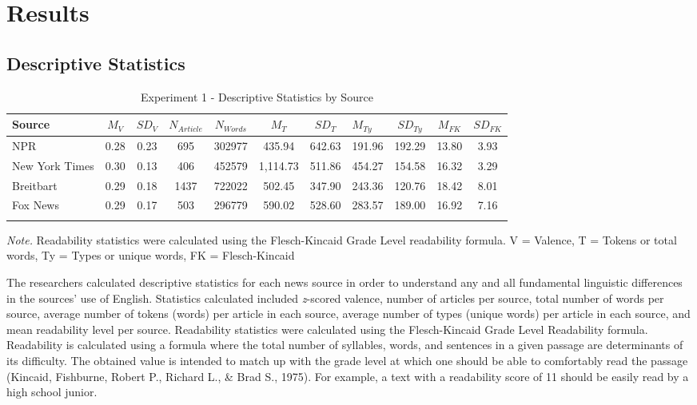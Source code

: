 \documentclass[english,,man]{apa6}
\begin{document}
\hypertarget{results}{%
\section{Results}\label{results}}

\hypertarget{descriptive-statistics}{%
\subsection{Descriptive Statistics}\label{descriptive-statistics}}

\begin{table}[tbp]
\begin{center}
\begin{threeparttable}
\caption{\label{tab:exp1-source-descriptives}Experiment 1 - Descriptive Statistics by Source}
\begin{tabular}{lcccccclccc}
\toprule
Source & $M_V$ & $SD_V$ & $N_{Article}$ & $N_{Words}$ & $M_T$ & $SD_T$ & $M_{Ty}$ & $SD_{Ty}$ & $M_{FK}$ & $SD_{FK}$\\
\midrule
NPR & 0.28 & 0.23 & 695 & 302977 & 435.94 & 642.63 & 191.96 & 192.29 & 13.80 & 3.93\\
New York Times & 0.30 & 0.13 & 406 & 452579 & 1,114.73 & 511.86 & 454.27 & 154.58 & 16.32 & 3.29\\
Breitbart & 0.29 & 0.18 & 1437 & 722022 & 502.45 & 347.90 & 243.36 & 120.76 & 18.42 & 8.01\\
Fox News & 0.29 & 0.17 & 503 & 296779 & 590.02 & 528.60 & 283.57 & 189.00 & 16.92 & 7.16\\
\bottomrule
\addlinespace
\end{tabular}
\begin{tablenotes}[para]
\normalsize{\textit{Note.} Readability statistics were calculated using the Flesch-Kincaid Grade Level readability formula. V = Valence, T = Tokens or total words, Ty = Types or unique words, FK = Flesch-Kincaid}
\end{tablenotes}
\end{threeparttable}
\end{center}
\end{table}

The researchers calculated descriptive statistics for each news source in order to understand any and all fundamental linguistic differences in the sources' use of English. Statistics calculated included \emph{z}-scored valence, number of articles per source, total number of words per source, average number of tokens (words) per article in each source, average number of types (unique words) per article in each source, and mean readability level per source. Readability statistics were calculated using the Flesch-Kincaid Grade Level Readability formula. Readability is calculated using a formula where the total number of syllables, words, and sentences in a given passage are determinants of its difficulty. The obtained value is intended to match up with the grade level at which one should be able to comfortably read the passage (Kincaid, Fishburne, Robert P., Richard L., \& Brad S., 1975). For example, a text with a readability score of 11 should be easily read by a high school junior.
\end{document}
